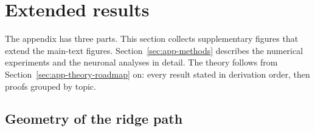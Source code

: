 
\providecommand{\suppfigplaceholder}[2][0.22\textheight]{%
  \fbox{\parbox[c][#1][c]{0.95\linewidth}{\centering\small
  \textcolor{magenta}{\textbf{[figure to insert]}}\\[2pt]
  \texttt{\detokenize{#2}}}}}

\section{Extended results}
\label{sec:app-extended-results}

The appendix has three parts.  This section collects supplementary figures
that extend the main-text figures.  Section~\ref{sec:app-methods} describes
the numerical experiments and the neuronal analyses in detail.  The theory
follows from Section~\ref{sec:app-theory-roadmap} on: every result stated in
derivation order, then proofs grouped by topic.

\subsection{Geometry of the ridge path}
\label{sec:app-ext-geometry}

